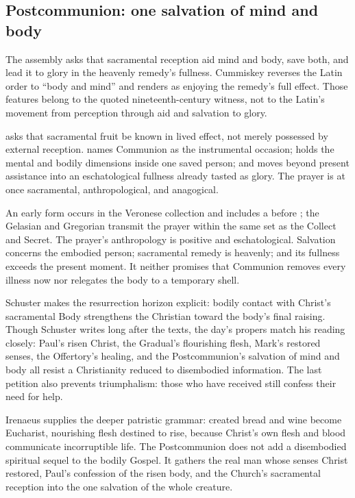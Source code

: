\subsection*{Postcommunion: one salvation of mind and body\enspace{}}

The assembly asks that sacramental reception aid mind and body, save both, and
lead it to glory in the heavenly remedy's fullness. Cummiskey reverses the
Latin order to ``body and mind'' and renders  as
enjoying the remedy's full effect. Those features belong to the quoted
nineteenth-century witness, not to the Latin's movement from perception
through aid and salvation to glory.

 asks that sacramental fruit be known in lived effect, not
merely possessed by external reception. 
names Communion as the instrumental occasion; 
holds the mental and bodily dimensions inside one saved person; and
 moves beyond present assistance into an
eschatological fullness already tasted as glory. The prayer is at once
sacramental, anthropological, and anagogical.

An early form occurs in the Veronese collection and includes a
 before ; the Gelasian and
Gregorian transmit the prayer within the same set as the Collect and Secret.
The prayer's anthropology is positive and eschatological. Salvation concerns
the embodied person; sacramental remedy is heavenly; and its fullness exceeds
the present moment. It neither promises that Communion removes every illness
now nor relegates the body to a temporary shell.

Schuster makes the resurrection horizon explicit: bodily contact with
Christ's sacramental Body strengthens the Christian toward the body's final
raising. Though Schuster writes long after the texts, the day's propers
match his reading closely: Paul's risen Christ, the Gradual's
flourishing flesh, Mark's restored senses, the Offertory's healing, and the
Postcommunion's salvation of mind and body all resist a Christianity reduced
to disembodied information. The last petition also prevents triumphalism:
those who have received still confess their need for help.

Irenaeus supplies the deeper patristic grammar: created bread and wine become
Eucharist, nourishing flesh destined to rise, because Christ's own flesh and
blood communicate incorruptible life. The Postcommunion does not add a
disembodied spiritual sequel to the bodily Gospel. It gathers the real man
whose senses Christ restored, Paul's confession of the risen body, and the
Church's sacramental reception into the one salvation of the whole creature.
